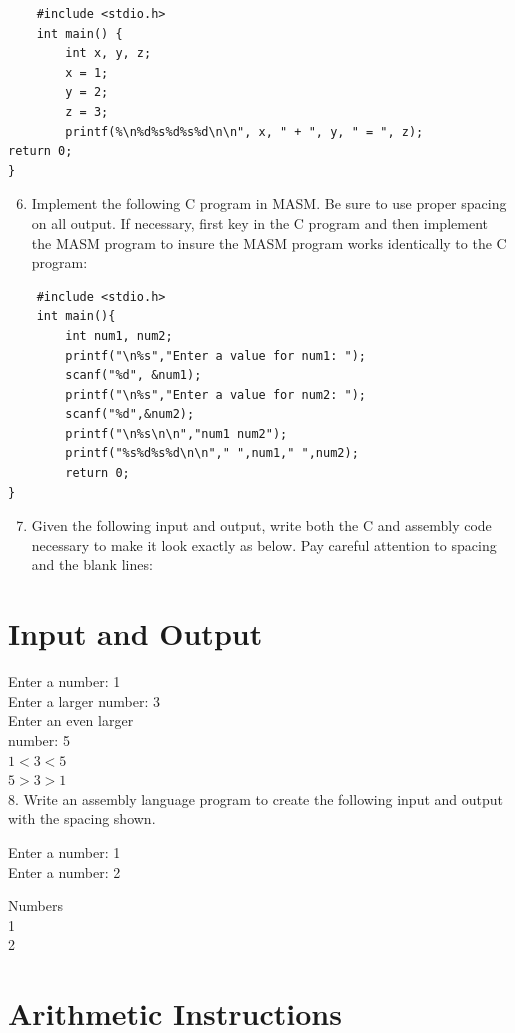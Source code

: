 \documentclass[10pt]{article}
\begin{document}
\begin{verbatim}
    #include <stdio.h>
    int main() {
        int x, y, z;
        x = 1;
        y = 2;
        z = 3;
        printf(%\n%d%s%d%s%d\n\n", x, " + ", y, " = ", z);
return 0;
}
\end{verbatim}

\begin{enumerate}
  \setcounter{enumi}{5}
  \item Implement the following C program in MASM. Be sure to use proper spacing on all output. If necessary, first key in the C program and then implement the MASM program to insure the MASM program works identically to the C program:
\end{enumerate}

\begin{verbatim}
    #include <stdio.h>
    int main(){
        int num1, num2;
        printf("\n%s","Enter a value for num1: ");
        scanf("%d", &num1);
        printf("\n%s","Enter a value for num2: ");
        scanf("%d",&num2);
        printf("\n%s\n\n","num1 num2");
        printf("%s%d%s%d\n\n"," ",num1," ",num2);
        return 0;
}
\end{verbatim}

\begin{enumerate}
  \setcounter{enumi}{6}
  \item Given the following input and output, write both the C and assembly code necessary to make it look exactly as below. Pay careful attention to spacing and the blank lines:
\end{enumerate}

\section*{Input and Output}
Enter a number: 1\\
Enter a larger number: 3\\
Enter an even larger\\
number: 5\\
$1<3<5$\\
$5>3>1$\\
8. Write an assembly language program to create the following input and output with the spacing shown.

Enter a number: 1\\
Enter a number: 2

Numbers\\
1\\
2

\section*{Arithmetic Instructions}
\end{document}
